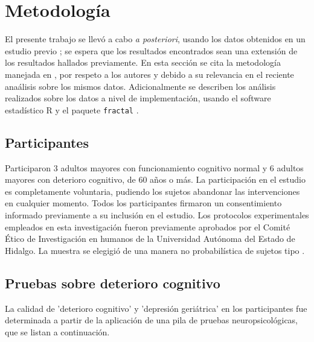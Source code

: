 \chapter{Metodolog\'ia}

El presente trabajo se llev\'o a cabo \textit{a posteriori}, usando los datos obtenidos en un 
estudio previo \cite[V\'azquez Tagle, 2016]{VazquezTagle16}; 
se espera que los resultados encontrados sean una
extensi\'on de los resultados hallados previamente. En esta secci\'on se cita la metodolog\'ia 
manejada en \cite{VazquezTagle16}, por respeto a los autores y debido a su relevancia en el 
reciente ana\'alisis sobre los mismos datos. Adicionalmente se describen los an\'alisis realizados
sobre los datos a nivel de implementaci\'on, usando el software estad\'istico R
y el paquete \texttt{fractal} \cite{R_citar,R_fractal}.


\section{Participantes}

Participaron 3 adultos mayores con funcionamiento cognitivo normal y 6 adultos mayores con 
deterioro cognitivo, de 60 a\~nos o m\'as. La participaci\'on en el estudio es completamente 
voluntaria, pudiendo los sujetos abandonar las intervenciones en cualquier momento. Todos los 
participantes firmaron un consentimiento informado previamente a su inclusi\'on en el estudio. 
Los protocolos experimentales empleados en esta investigaci\'on fueron previamente aprobados por 
el Comit\'e \'Etico de Investigaci\'on en humanos de la Universidad Autónoma del Estado de Hidalgo.
La muestra se elegigi\'o de una manera no probabilística de sujetos tipo \cite{Garcia09}.


\section{Pruebas sobre deterioro cognitivo}

La calidad de 'deterioro cognitivo' y 'depresi\'on geri\'atrica' en los participantes fue
determinada a partir de la aplicaci\'on de una pila de pruebas neuropsicol\'ogicas, que se
listan a continuaci\'on.

